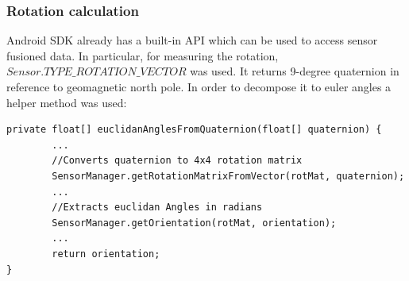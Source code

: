 \subsubsection{Rotation calculation}
Android SDK already has a built-in API which can be used to access sensor fusioned data. In particular, for measuring the rotation, $Sensor.TYPE\_ROTATION\_VECTOR$ was used. It returns 9-degree quaternion in reference to geomagnetic north pole. In order to decompose it to euler angles a helper method was used:
\lstset{escapechar=@,style=customjava}
\begin{lstlisting}
private float[] euclidanAnglesFromQuaternion(float[] quaternion) {
        ...
        //Converts quaternion to 4x4 rotation matrix
        SensorManager.getRotationMatrixFromVector(rotMat, quaternion);
        ...
        //Extracts euclidan Angles in radians
        SensorManager.getOrientation(rotMat, orientation);
        ...
        return orientation;
}
\end{lstlisting}
